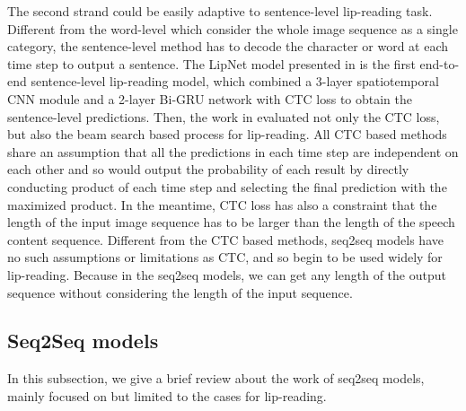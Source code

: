 \documentclass[a4paper, 10pt, conference]{ieeeconf}      %
\begin{document}
The second strand could be easily adaptive to sentence-level lip-reading task. Different from the word-level which consider the whole image sequence as a single category, the sentence-level method has to decode the character or word at each time step to output a sentence. The LipNet model presented in \cite{Assael2016} is the first end-to-end sentence-level lip-reading model, which combined a 3-layer spatiotemporal CNN module and a 2-layer Bi-GRU network with CTC loss to obtain the sentence-level predictions. Then, the work in \cite{Afouras} evaluated not only the CTC loss, but also the beam search based process \cite{Wiseman2016} for lip-reading. All CTC based methods share an assumption that all the predictions in each time step are independent on each other and so would output the probability of each result by directly conducting product of each time step and selecting the final prediction with the maximized product. In the meantime, CTC loss has also a constraint that the length of the input image sequence has to be larger than the length of the speech content sequence. Different from the CTC based methods, seq2seq models have no such assumptions or limitations as CTC, and so begin to be used widely for lip-reading. Because in the seq2seq models, we can get any length of the output sequence without considering the length of the input sequence.

\subsection{Seq2Seq models}
In this subsection, we give a brief review about the work of seq2seq models, mainly focused on but limited to the cases for lip-reading. 
\end{document}
